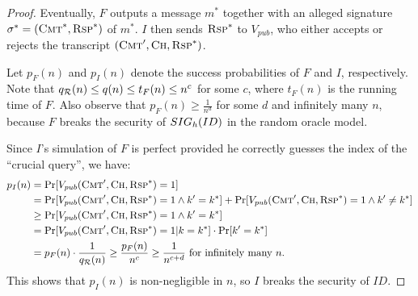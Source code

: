 \documentclass[12pt,twoside]{article}
\begin{document}
\begin{proof}
\medskip\noindent
Eventually, $F$ outputs a message $m^*$ together with an alleged signature
$\sigma^* = (\textsc{Cmt}^*,\textsc{Rsp}^*)$ of $m^*$. $I$ then sends
$\textsc{Rsp}^*$ to $V_{pub}$, who either accepts or rejects the transcript
$(\textsc{Cmt}',\textsc{Ch},\textsc{Rsp}^*)$.

\medskip\noindent
Let $p_F(n)$ and $p_I(n)$ denote the success probabilities of $F$ and $I$,
respectively. Note that $q_\fanr(n) \leq q(n) \leq t_F(n) \leq n^c$ for some
$c$, where $t_F(n)$ is the running time of $F$. Also observe that 
$p_F(n) \geq \frac{1}{n^d}$ for some $d$ and infinitely many $n$, because $F$ 
breaks the security of $\fs{ID}{h}$ in the random oracle model.

\medskip\noindent 
Since $I$'s simulation of $F$ is perfect provided he correctly guesses the
index of the ``crucial query'', we have:
\begin{align*}
p_I(n) & = \text{Pr}[V_{pub}(\textsc{Cmt}',\textsc{Ch},\textsc{Rsp}^*) = 1] \\
& = \text{Pr}[V_{pub}(\textsc{Cmt}',\textsc{Ch},\textsc{Rsp}^*) = 1 
\wedge k' = k^*] + \text{Pr}[V_{pub}(\textsc{Cmt}',\textsc{Ch},\textsc{Rsp}^*)
= 1 \wedge k' \neq k^*] \\
& \geq \text{Pr}[V_{pub}(\textsc{Cmt}',\textsc{Ch},\textsc{Rsp}^*) = 1 
\wedge k' = k^*] \\
& = \text{Pr}[V_{pub}(\textsc{Cmt}',\textsc{Ch},\textsc{Rsp}^*) 
= 1 | k = k^*] \cdot \text{Pr}[k' = k^*] \\
& = p_F(n) 
\cdot \frac{1}{q_\fanr(n)} \geq \frac{p_F(n)}{n^c}
\geq \frac{1}{n^{c+d}} \text{ for infinitely many } n.
\end{align*}
This shows that $p_I(n)$ is non-negligible in $n$, so $I$ breaks the 
security of $ID$.
\end{proof}
\end{document}
